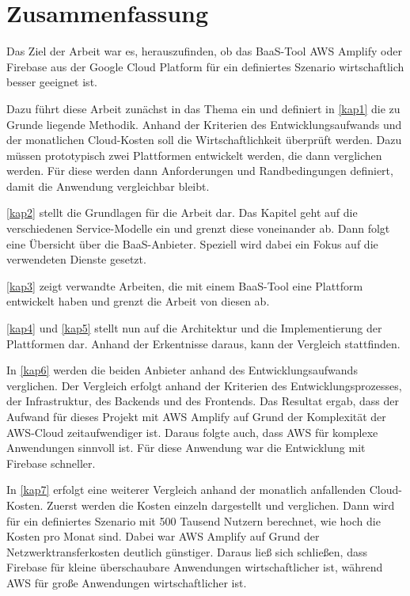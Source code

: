 \chapter{Zusammenfassung}

Das Ziel der Arbeit war es, herauszufinden, ob das \ac{BaaS}-Tool \ac{AWS} Amplify oder Firebase aus der Google Cloud Platform für ein definiertes Szenario wirtschaftlich besser geeignet ist.

Dazu führt diese Arbeit zunächst in das Thema ein und definiert in \autoref{kap1} die zu Grunde liegende Methodik. Anhand der Kriterien des Entwicklungsaufwands und der monatlichen Cloud-Kosten soll die Wirtschaftlichkeit überprüft werden. Dazu müssen prototypisch zwei Plattformen entwickelt werden, die dann verglichen werden. Für diese werden dann Anforderungen und Randbedingungen definiert, damit die Anwendung vergleichbar bleibt.

\autoref{kap2} stellt die Grundlagen für die Arbeit dar. Das Kapitel geht auf die verschiedenen Service-Modelle ein und grenzt diese voneinander ab. Dann folgt eine Übersicht über die \ac{BaaS}-Anbieter. Speziell wird dabei ein Fokus auf die verwendeten Dienste gesetzt.

\autoref{kap3} zeigt verwandte Arbeiten, die mit einem \ac{BaaS}-Tool eine Plattform entwickelt haben und grenzt die Arbeit von diesen ab.

\autoref{kap4} und \autoref{kap5} stellt nun auf die Architektur und die Implementierung der Plattformen dar. Anhand der Erkentnisse daraus, kann der Vergleich stattfinden.

In \autoref{kap6} werden die beiden Anbieter anhand des Entwicklungsaufwands verglichen. Der Vergleich erfolgt anhand der Kriterien des Entwicklungsprozesses, der Infrastruktur, des Backends und des Frontends. Das Resultat ergab, dass der Aufwand für dieses Projekt mit \ac{AWS} Amplify auf Grund der Komplexität der \ac{AWS}-Cloud zeitaufwendiger ist. Daraus folgte auch, dass \ac{AWS} für komplexe Anwendungen sinnvoll ist. Für diese Anwendung war die Entwicklung mit Firebase schneller.

In \autoref{kap7} erfolgt eine weiterer Vergleich anhand der monatlich anfallenden Cloud-Kosten. Zuerst werden die Kosten einzeln dargestellt und verglichen. Dann wird für ein definiertes Szenario mit 500 Tausend Nutzern berechnet, wie hoch die Kosten pro Monat sind. Dabei war \ac{AWS} Amplify auf Grund der Netzwerktransferkosten deutlich günstiger. Daraus ließ sich schließen, dass Firebase für kleine überschaubare Anwendungen wirtschaftlicher ist, während \ac{AWS} für große Anwendungen wirtschaftlicher ist.

